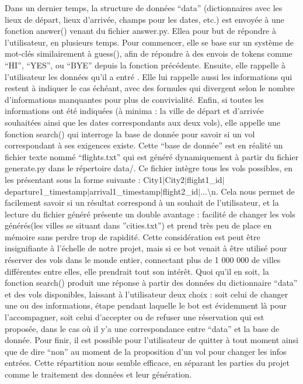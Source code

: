 \documentclass[]{article}
\begin{document}
\bigskip
\bigskip
\huge{\textbf{\color{title}{4) Intéraction avec l’utilisateur : answer.py}}}
\bigskip
\large{

Dans un dernier temps, la structure de données “data” (dictionnaires avec les lieux de départ, lieux d’arrivée, champs pour les dates, etc.) est envoyée à une fonction answer() venant du fichier answer.py. Ellea pour but de répondre à l’utilisateur, en plusieurs temps. Pour commencer, elle se base sur un système de mot-clés similairement à guess(), afin de répondre à des envois de tokens comme “HI”, “YES”, ou “BYE” depuis la fonction précédente. Ensuite, elle rappelle à l’utilisateur les données qu’il a entré . Elle lui rappelle aussi les informations qui restent à indiquer le cas échéant, avec des formules qui divergent selon le nombre d’informations manquantes pour plus de convivialité. Enfin, si toutes les informations ont été indiquées (à minima : la ville de départ et d’arrivée souhaitées ainsi que les dates correspondants aux deux vols), elle appelle une fonction search() qui interroge la base de donnée pour savoir si un vol correspondant à ses exigences existe. Cette “base de donnée” est en réalité un fichier texte nommé “flights.txt” qui est généré dynamiquement à partir du fichier generate.py dans le répertoire data/. Ce fichier intègre tous les vols possibles, en les présentant sous la forme suivante : City1$\vert$City2$\vert$flight1\_id$\vert$departure1\_timestamp$\vert$arrival1\_timestamp$\vert$flight2\_id$\vert$...\textbackslash n. Cela nous permet de facilement savoir si un résultat correspond à un souhait de l’utilisateur, et la lecture du fichier généré présente un double avantage : facilité de changer les vols générés(les villes se situant dans ”cities.txt”) et prend très peu de place en mémoire sans perdre trop de rapidité. Cette considération est peut être insignifiante à l’échelle de notre projet, mais si ce bot venait à être utilisé pour réserver des vols dans le monde entier, connectant plus de 1 000 000 de villes différentes entre elles, elle prendrait tout son intérêt. Quoi qu’il en soit, la fonction search() produit une réponse à partir des données du dictionnaire “data” et des vols disponibles, laissant à l’utilisateur deux choix : soit  celui de changer une ou des informations, étape pendant laquelle le bot est évidemment là pour l’accompagner, soit celui d’accepter ou de refuser une réservation qui est proposée, dans le cas où il y’a une correspondance entre “data” et la base de donnée.
Pour finir, il est possible pour l’utilisateur de quitter à tout moment ainsi que de dire “non” au moment de la proposition d’un vol pour changer les infos entrées.
Cette répartition nous semble efficace, en séparant les parties du projet comme le traitement des données et leur génération.

}
\end{document}
